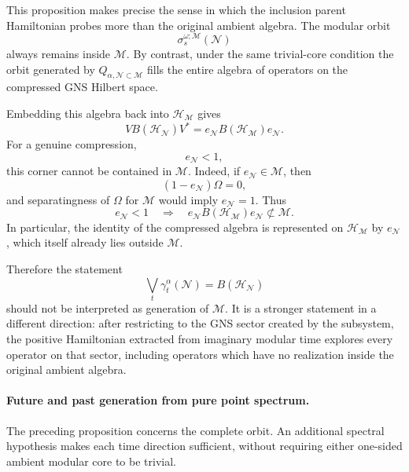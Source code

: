 \documentclass[a4paper,11pt]{article}
\theoremstyle{definition}
\newcommand{\mN}{\mathcal{N}}
\newcommand{\mH}{\mathcal{H}}
\newcommand{\mM}{\mathcal{M}}
\begin{document}
This proposition makes precise the sense in which the inclusion parent Hamiltonian
probes more than the original ambient algebra. The modular orbit
\begin{equation}
    \sigma_s^{\omega;\mM}(\mN)
\end{equation}
always remains inside $\mM$. By contrast, under the same
trivial-core condition the orbit generated by $Q_{\alpha,\mN\subset\mM}$
fills the entire algebra of operators on the compressed GNS Hilbert space.

Embedding this algebra back into $\mH_{\mM}$ gives
\begin{equation}
    V B(\mH_{\mN})V^*
    =
    e_{\mN}B(\mH_{\mM})e_{\mN} .
    \label{eq:corner-BHN}
\end{equation}
For a genuine compression,
\begin{equation}
    e_{\mN}<1,
\end{equation}
this corner cannot be contained in $\mM$. Indeed, if
$e_{\mN}\in\mM$, then
\begin{equation}
    (1-e_{\mN})\Omega=0,
\end{equation}
and separatingness of $\Omega$ for $\mM$ would imply
$e_{\mN}=1$. Thus
\begin{equation}
    \boxed{
    e_{\mN}<1
    \quad\Longrightarrow\quad
    e_{\mN}B(\mH_{\mM})e_{\mN}
    \not\subset\mM.
    }
    \label{eq:corner-outside-M}
\end{equation}
In particular, the identity of the compressed algebra is represented on
$\mH_{\mM}$ by $e_{\mN}$, which itself already lies outside $\mM$.

Therefore the statement
\begin{equation}
    \bigvee_t\gamma_t^\alpha(\mN)
    =
    B(\mH_{\mN})
\end{equation}
should not be interpreted as generation of $\mM$. It is a stronger
statement in a different direction: after restricting to the GNS sector
created by the subsystem, the positive Hamiltonian extracted from imaginary
modular time explores every operator on that sector, including operators
which have no realization inside the original ambient algebra.

\paragraph{Future and past generation from pure point spectrum.}
The preceding proposition concerns the complete orbit. An additional
spectral hypothesis makes each time direction sufficient, without
requiring either one-sided ambient modular core to be trivial.
\end{document}

